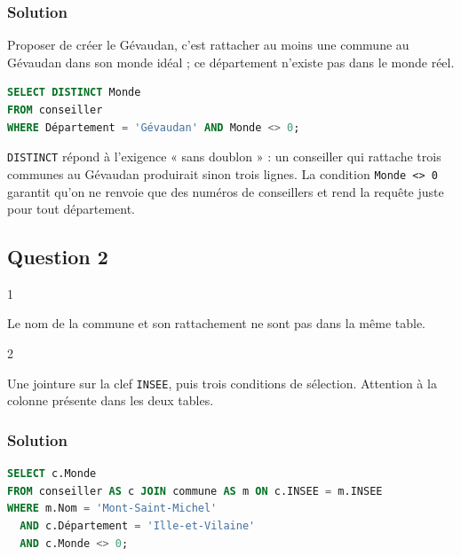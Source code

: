 \documentclass[11pt,a4paper]{article}
\begin{document}
\hypertarget{solution}{%
\subsubsection{Solution}\label{solution}}

Proposer de créer le Gévaudan, c'est rattacher au moins une commune au Gévaudan dans son monde idéal ; ce département n'existe pas dans le monde réel.

\begin{lstlisting}[language=SQL]
SELECT DISTINCT Monde
FROM conseiller
WHERE Département = 'Gévaudan' AND Monde <> 0;
\end{lstlisting}

\texttt{DISTINCT} répond à l'exigence « sans doublon » : un conseiller qui rattache trois communes au Gévaudan produirait sinon trois lignes. La condition \texttt{Monde\ \textless{}\textgreater{}\ 0} garantit qu'on ne renvoie que des numéros de conseillers et rend la requête juste pour tout département.

\hypertarget{question-2}{%
\subsection{Question 2}\label{question-2}}

\begin{indication}{1}

Le nom de la commune et son rattachement ne sont pas dans la même table.

\end{indication}

\begin{indication}{2}

Une jointure sur la clef \texttt{INSEE}, puis trois conditions de sélection. Attention à la colonne présente dans les deux tables.

\end{indication}

\hypertarget{solution-1}{%
\subsubsection{Solution}\label{solution-1}}

\begin{lstlisting}[language=SQL]
SELECT c.Monde
FROM conseiller AS c JOIN commune AS m ON c.INSEE = m.INSEE
WHERE m.Nom = 'Mont-Saint-Michel'
  AND c.Département = 'Ille-et-Vilaine'
  AND c.Monde <> 0;
\end{lstlisting}
\end{document}

